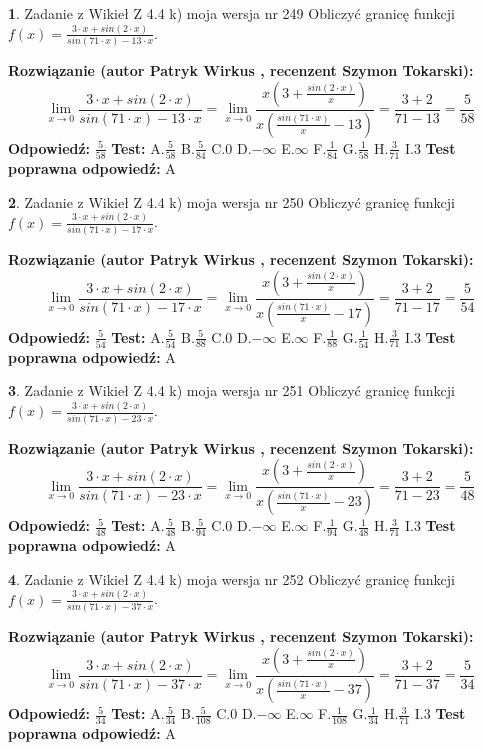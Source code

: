 \documentclass[12pt, a4paper]{article}
\theoremstyle{definition} %
\newtheorem{zad}{}
\newcommand{\zadStart}[1]{\begin{zad}#1\newline}
\newcommand{\zadStop}{\end{zad}}
\newcommand{\rozwStart}[2]{\noindent \textbf{Rozwiązanie (autor #1 , recenzent #2): }\newline}
\newcommand{\rozwStop}{\newline}
\newcommand{\odpStart}{\noindent \textbf{Odpowiedź:}\newline}
\newcommand{\odpStop}{\newline}
\newcommand{\testStart}{\noindent \textbf{Test:}\newline}
\newcommand{\testStop}{\newline}
\newcommand{\kluczStart}{\noindent \textbf{Test poprawna odpowiedź:}\newline}
\newcommand{\kluczStop}{\newline}
\begin{document}
\zadStart{Zadanie z Wikieł Z 4.4 k) moja wersja nr 249}
Obliczyć granicę funkcji $f(x)=\frac{3\cdot x +sin(2\cdot x)}{sin(71\cdot x) -13\cdot x}$.
\zadStop
\rozwStart{Patryk Wirkus}{Szymon Tokarski}
$$\lim\limits_{x\to 0}\frac{3\cdot x +sin(2\cdot x)}{sin(71\cdot x) -13\cdot x}
=\lim\limits_{x\to 0}\frac{x(3+\frac{sin(2\cdot x)}{x})}{x(\frac{sin(71\cdot x)}{x}-13)}
=\frac{3+2}{71-13} = \frac{5}{58}$$
\rozwStop
\odpStart
$\frac{5}{58}$
\odpStop
\testStart
A.$\frac{5}{58}$
B.$\frac{5}{84}$
C.$0$
D.$-\infty$
E.$\infty$
F.$\frac{1}{84}$
G.$\frac{1}{58}$
H.$\frac{3}{71}$
I.$3$
\testStop
\kluczStart
A
\kluczStop



\zadStart{Zadanie z Wikieł Z 4.4 k) moja wersja nr 250}
Obliczyć granicę funkcji $f(x)=\frac{3\cdot x +sin(2\cdot x)}{sin(71\cdot x) -17\cdot x}$.
\zadStop
\rozwStart{Patryk Wirkus}{Szymon Tokarski}
$$\lim\limits_{x\to 0}\frac{3\cdot x +sin(2\cdot x)}{sin(71\cdot x) -17\cdot x}
=\lim\limits_{x\to 0}\frac{x(3+\frac{sin(2\cdot x)}{x})}{x(\frac{sin(71\cdot x)}{x}-17)}
=\frac{3+2}{71-17} = \frac{5}{54}$$
\rozwStop
\odpStart
$\frac{5}{54}$
\odpStop
\testStart
A.$\frac{5}{54}$
B.$\frac{5}{88}$
C.$0$
D.$-\infty$
E.$\infty$
F.$\frac{1}{88}$
G.$\frac{1}{54}$
H.$\frac{3}{71}$
I.$3$
\testStop
\kluczStart
A
\kluczStop



\zadStart{Zadanie z Wikieł Z 4.4 k) moja wersja nr 251}
Obliczyć granicę funkcji $f(x)=\frac{3\cdot x +sin(2\cdot x)}{sin(71\cdot x) -23\cdot x}$.
\zadStop
\rozwStart{Patryk Wirkus}{Szymon Tokarski}
$$\lim\limits_{x\to 0}\frac{3\cdot x +sin(2\cdot x)}{sin(71\cdot x) -23\cdot x}
=\lim\limits_{x\to 0}\frac{x(3+\frac{sin(2\cdot x)}{x})}{x(\frac{sin(71\cdot x)}{x}-23)}
=\frac{3+2}{71-23} = \frac{5}{48}$$
\rozwStop
\odpStart
$\frac{5}{48}$
\odpStop
\testStart
A.$\frac{5}{48}$
B.$\frac{5}{94}$
C.$0$
D.$-\infty$
E.$\infty$
F.$\frac{1}{94}$
G.$\frac{1}{48}$
H.$\frac{3}{71}$
I.$3$
\testStop
\kluczStart
A
\kluczStop



\zadStart{Zadanie z Wikieł Z 4.4 k) moja wersja nr 252}
Obliczyć granicę funkcji $f(x)=\frac{3\cdot x +sin(2\cdot x)}{sin(71\cdot x) -37\cdot x}$.
\zadStop
\rozwStart{Patryk Wirkus}{Szymon Tokarski}
$$\lim\limits_{x\to 0}\frac{3\cdot x +sin(2\cdot x)}{sin(71\cdot x) -37\cdot x}
=\lim\limits_{x\to 0}\frac{x(3+\frac{sin(2\cdot x)}{x})}{x(\frac{sin(71\cdot x)}{x}-37)}
=\frac{3+2}{71-37} = \frac{5}{34}$$
\rozwStop
\odpStart
$\frac{5}{34}$
\odpStop
\testStart
A.$\frac{5}{34}$
B.$\frac{5}{108}$
C.$0$
D.$-\infty$
E.$\infty$
F.$\frac{1}{108}$
G.$\frac{1}{34}$
H.$\frac{3}{71}$
I.$3$
\testStop
\kluczStart
A
\kluczStop
\end{document}
